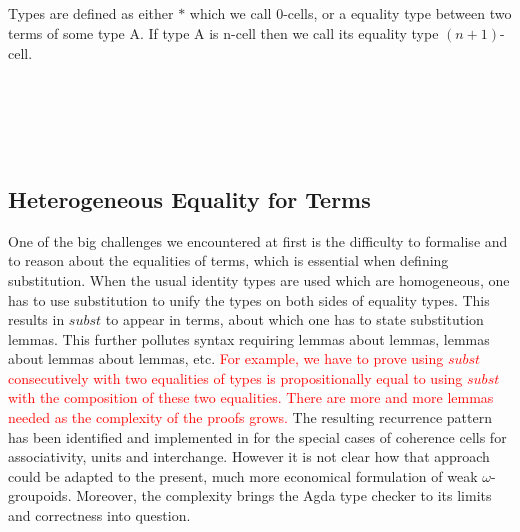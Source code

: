 \documentclass{acm_proc_article-sp}
\newcommand{\wog}{weak $\omega$-groupoids}
\newcommand{\new}{\textcolor{red}}
\begin{document}
\begin{code}\>\<%
\\
\>  \<%
\\
\>[0]\<[2]%
\>[2] \<[8]%
\>[8]\AgdaSymbol{:} \<%
\\
\>[0]\<[2]%
\>[2]\AgdaInductiveConstructor{\_,\_} \<[8]%
\>[8]\AgdaSymbol{:} \AgdaSymbol{(} \AgdaSymbol{:} \AgdaSymbol{)(} \AgdaSymbol{:}  \AgdaSymbol{)}  \<%
\\
\>\<\end{code}
Types are defined as either $*$ which we
call 0-cells, or a equality type between two terms of some type A. If 
type A is n-cell then we call its equality type $(n+1)$-cell.

\begin{code}\>\<%
\\
\>   \<%
\\
\>[0]\<[2]%
\>[2]\AgdaInductiveConstructor{*} \<[8]%
\>[8]\AgdaSymbol{:}  \<%
\\
\>[0]\<[2]%
\>[2] \<[8]%
\>[8]\AgdaSymbol{:} \AgdaSymbol{\{} \AgdaSymbol{:}  \AgdaSymbol{\}(}  \AgdaSymbol{:}  \AgdaSymbol{)}   \<%
\\
\>\<\end{code}

\subsection{Heterogeneous Equality for Terms}

One of the big challenges we encountered at first is the difficulty to
formalise and to reason about the equalities of terms, which is
essential when defining substitution.  When the usual identity types
are used which are homogeneous, one has to use substitution to unify
the types on both sides of equality types. This results in
$\mathit{subst}$ to appear in terms, about which one has to state
substitution lemmas. This further pollutes syntax requiring lemmas
about lemmas, lemmas about lemmas about lemmas, etc. \new{For example, we have to prove using $\mathit{subst}$ consecutively with two equalities of types is propositionally equal to using $\mathit{subst}$ with the composition of these two equalities. There are more and more lemmas needed as the complexity of the proofs grows.} The resulting
recurrence pattern has been identified and implemented in
\cite{txa:csl} for the special cases of coherence cells for
associativity, units and interchange. However it is not clear how that
approach could be adapted to the present, much more economical
formulation of {\wog}. Moreover, the complexity brings the
Agda type checker to its limits and correctness into question.
\end{document}
